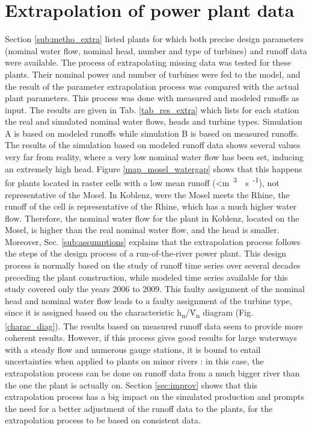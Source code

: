 \section{Extrapolation of power plant data}
\label{sec:missing_data}
Section \ref{sub:metho_extra} listed plants for which both precise design parameters (nominal water flow, nominal head, number and type of turbines) and runoff data were available. The process of extrapolating missing data was tested for these plants. Their nominal power and number of turbines were fed to the model, and the result of the parameter extrapolation process was compared with the actual plant parameters. This process was done with measured and modeled runoffs as input. The results are given in Tab. \ref{tab_res_extra} which lists for each station the real and simulated nominal water flows, heads and turbine types. Simulation A is based on modeled runoffs while simulation B is based on measured runoffs. \newline
The results of the simulation based on modeled runoff data shows several values very far from reality, where a very low nominal water flow has been set, inducing an extremely high head. Figure \ref{map_mosel_watergap} shows that this happens for plants located in raster cells with a low mean runoff (<\unit[10]{m\textsuperscript{3}\textperiodcentered s\textsuperscript{-1}}), not representative of the Mosel. In Koblenz, were the Mosel meets the Rhine, the runoff of the cell is representative of the Rhine, which has a much higher water flow. Therefore, the nominal water flow for the plant in Koblenz, located on the Mosel, is higher than the real nominal water flow, and the head is smaller. Moreover, Sec. \ref{sub:assumptions} explains that the extrapolation process follows the steps of the design process of a run-of-the-river power plant. This design process is normally based on the study of runoff time series over several decades preceding the plant construction, while modeled time series available for this study covered only the years 2006 to 2009. \newline
This faulty assignment of the nominal head and nominal water flow leads to a faulty assignment of the turbine type, since it is assigned based on the characteristic h\textsubscript{n}/\.V\textsubscript{n} diagram (Fig. \ref{charac_diag}). \newline
The results based on measured runoff data seem to provide more coherent results. However, if this process gives good results for large waterways with a steady flow and numerous gauge stations, it is bound to entail uncertainties when applied to plants on minor rivers : in this case, the extrapolation process can be done on runoff data from a much bigger river than the one the plant is actually on.\newline
Section \ref{sec:improv} shows that this extrapolation process has a big impact on the simulated production and prompts the need for a better adjustment of the runoff data to the plants, for the extrapolation process to be based on consistent data.


